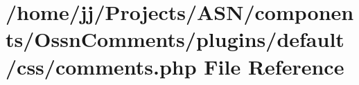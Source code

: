 \hypertarget{_ossn_comments_2plugins_2default_2css_2comments_8php}{}\section{/home/jj/\+Projects/\+A\+S\+N/components/\+Ossn\+Comments/plugins/default/css/comments.php File Reference}
\label{_ossn_comments_2plugins_2default_2css_2comments_8php}
